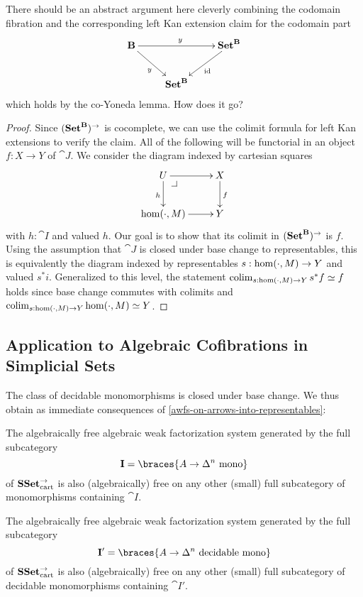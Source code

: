\documentclass[reqno,10pt,a4paper,oneside]{amsart}
\begin{document}
\begin{question}
There should be an abstract argument here cleverly combining the codomain fibration and the corresponding left Kan extension claim for the codomain part
\[
\xymatrix{
  \cat{B}
  \ar[rr]^{y}
  \ar[dr]_{y}
&&
  \Set^{\cat{B}}
  \ar[dl]^{\id}
\\&
  \Set^{\cat{B}}
}
\]
which holds by the co-Yoneda lemma.
How does it go?
\end{question}

\begin{proof}
Since $(\mathbf{Set}^{\mathbf{B}})^{\to}$ is cocomplete, we can use the colimit formula for left Kan extensions to verify the claim.
All of the following will be functorial in an object $f : X \to Y$ of $\cat{J}$.
We consider the diagram indexed by cartesian squares
\[
\xymatrix{
  U
  \ar[r]
  \ar[d]_{h}
  \pullback{dr}
&
  X
  \ar[d]^{f}
\\
  \hom(\arghole, M)
  \ar[r]
&
  Y
}
\]
with $h : \cat{I}$ and valued $h$.
Our goal is to show that its colimit in $(\mathbf{Set}^{\mathbf{B}})^{\to}$ is $f$.
Using the assumption that $\cat{J}$ is closed under base change to representables, this is equivalently the diagram indexed by representables $s : \hom(\mathop{\cdot}, M) \to Y$ and valued $s^* i$.
Generalized to this level, the statement $\operatorname{colim}_{s : \hom(\mathop{\cdot}, M) \to Y} s^* f \simeq f$ holds since base change commutes with colimits and $\operatorname{colim}_{s : \hom(\mathop{\cdot}, M) \to Y} \hom(\mathop{\cdot}, M) \simeq Y$.
\end{proof}

\subsection{Application to Algebraic Cofibrations in Simplicial Sets}

The class of decidable monomorphisms is closed under base change.
We thus obtain as immediate consequences of \cref{awfs-on-arrows-into-representables}:

\begin{corollary}
\label{monos-into-representables}
The algebraically free algebraic weak factorization system generated by the full subcategory
\[\cat{I} = \braces{A \to \Delta^n\ \text{\normalfont{mono}}}\]
of $\mathbf{SSet}_{\text{\normalfont{cart}}}^{\to}$ is also (algebraically) free on any other (small) full subcategory of monomorphisms containing $\cat{I}$.
\end{corollary}

\begin{corollary}
\label{decidable-monos-into-representables}
The algebraically free algebraic weak factorization system generated by the full subcategory
\[\cat{I}' = \braces{A \to \Delta^n\ \text{\normalfont{decidable mono}}}\]
of $\mathbf{SSet}_{\text{\normalfont{cart}}}^{\to}$ is also (algebraically) free on any other (small) full subcategory of decidable monomorphisms containing $\cat{I}'$.
\end{corollary}
\end{document}
